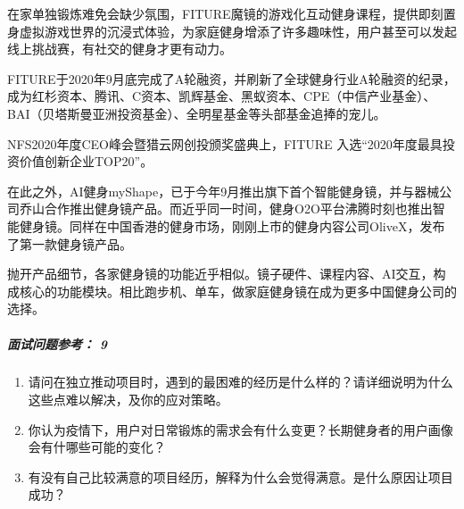 \documentclass[letterpaper,11pt,english]{sphinxmanual}
\begin{document}
在家单独锻炼难免会缺少氛围，FITURE魔镜的游戏化互动健身课程，提供即刻置身虚拟游戏世界的沉浸式体验，为家庭健身增添了许多趣味性，用户甚至可以发起线上挑战赛，有社交的健身才更有动力。

FITURE于2020年9月底完成了A轮融资，并刷新了全球健身行业A轮融资的纪录，成为红杉资本、腾讯、C资本、凯辉基金、黑蚁资本、CPE（中信产业基金）、BAI（贝塔斯曼亚洲投资基金）、全明星基金等头部基金追捧的宠儿。
%
\begin{footnote}[695]\sphinxAtStartFootnote
{}
%
\end{footnote}

NFS2020年度CEO峰会暨猎云网创投颁奖盛典上，FITURE
入选“2020年度最具投资价值创新企业TOP20”。

在此之外，AI健身myShape，已于今年9月推出旗下首个智能健身镜，并与器械公司乔山合作推出健身镜产品。而近乎同一时间，健身O2O平台沸腾时刻也推出智能健身镜。同样在中国香港的健身市场，刚刚上市的健身内容公司OliveX，发布了第一款健身镜产品。

抛开产品细节，各家健身镜的功能近乎相似。镜子硬件、课程内容、AI交互，构成核心的功能模块。相比跑步机、单车，做家庭健身镜在成为更多中国健身公司的选择。%
\begin{footnote}[696]\sphinxAtStartFootnote
{}
%
\end{footnote}


\subparagraph{面试问题参考： 9\sphinxfootnotemark[697]}
\label{\detokenize{chapter_project/AI_fit:id7}}%
\begin{footnotetext}[697]\sphinxAtStartFootnote
{}
%
\end{footnotetext}\ignorespaces \begin{enumerate}
%
\item {} 
请问在独立推动项目时，遇到的最困难的经历是什么样的？请详细说明为什么这些点难以解决，及你的应对策略。

\item {} 
你认为疫情下，用户对日常锻炼的需求会有什么变更？长期健身者的用户画像会有什哪些可能的变化？

\item {} 
有没有自己比较满意的项目经历，解释为什么会觉得满意。是什么原因让项目成功？

\end{enumerate}
\end{document}
